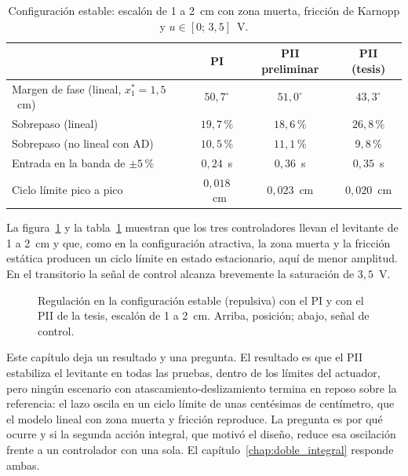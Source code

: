 \begin{table}[ht]
\centering
\caption{Configuración estable: escalón de 1 a 2~cm con zona muerta, fricción de Karnopp y $u\in[0;\,3{,}5]$~V.}
\label{tab:p8_estable}
\begin{tabular}{|l|c|c|c|}
\hline
 & PI & PII preliminar & PII (tesis) \\ \hline
Margen de fase (lineal, $x_1^*=1{,}5$~cm) & $50{,}7^\circ$ & $51{,}0^\circ$ & $43{,}3^\circ$ \\ \hline
Sobrepaso (lineal) & $19{,}7$\,\% & $18{,}6$\,\% & $26{,}8$\,\% \\ \hline
Sobrepaso (no lineal con AD) & $10{,}5$\,\% & $11{,}1$\,\% & $9{,}8$\,\% \\ \hline
Entrada en la banda de $\pm5$\,\% & $0{,}24$~s & $0{,}36$~s & $0{,}35$~s \\ \hline
Ciclo límite pico a pico & $0{,}018$~cm & $0{,}023$~cm & $0{,}020$~cm \\ \hline
\end{tabular}
\end{table}

La figura~\ref{fig:p8_estable} y la tabla~\ref{tab:p8_estable} muestran que los tres controladores llevan el levitante de 1 a 2~cm y que, como en la configuración atractiva, la zona muerta y la fricción estática producen un ciclo límite en estado estacionario, aquí de menor amplitud. En el transitorio la señal de control alcanza brevemente la saturación de $3{,}5$~V.

\begin{figure}[ht]
    \centering
    
    \caption[Configuración estable]{Regulación en la configuración estable (repulsiva) con el PI y con el PII de la tesis, escalón de 1 a 2~cm. Arriba, posición; abajo, señal de control.}
    \label{fig:p8_estable}
\end{figure}

\FloatBarrier

Este capítulo deja un resultado y una pregunta. El resultado es que el PII estabiliza el levitante en todas las pruebas, dentro de los límites del actuador, pero ningún escenario con atascamiento-deslizamiento termina en reposo sobre la referencia: el lazo oscila en un ciclo límite de unas centésimas de centímetro, que el modelo lineal con zona muerta y fricción reproduce. La pregunta es por qué ocurre y si la segunda acción integral, que motivó el diseño, reduce esa oscilación frente a un controlador con una sola. El capítulo~\ref{chap:doble_integral} responde ambas.
